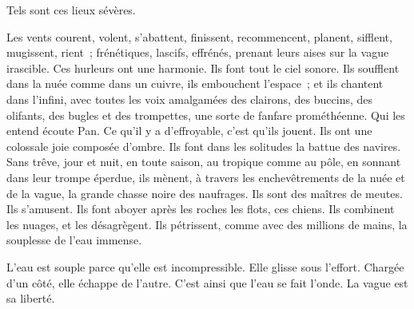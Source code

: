 \documentclass[french,twoside]{book} %
\begin{document}
Tels sont ces lieux sévères.\par
Les vents courent, volent, s’abattent, finissent, recommencent, planent, sifflent, mugissent, rient ; frénétiques, lascifs, effrénés, prenant leurs aises sur la vague irascible. Ces hurleurs ont une harmonie. Ils font tout le ciel sonore. Ils soufflent dans la nuée comme dans un cuivre, ils embouchent l’espace ; et ils chantent dans l’infini, avec toutes les voix amalgamées des clairons, des buccins, des olifants, des bugles et des trompettes, une sorte de fanfare prométhéenne. Qui les entend écoute Pan. Ce qu’il y a d’effroyable, c’est qu’ils jouent. Ils ont une colossale joie composée  d’ombre. Ils font dans les solitudes la battue des navires. Sans trêve, jour et nuit, en toute saison, au tropique comme au pôle, en sonnant dans leur trompe éperdue, ils mènent, à travers les enchevêtrements de la nuée et de la vague, la grande chasse noire des naufrages. Ils sont des maîtres de meutes. Ils s’amusent. Ils font aboyer après les roches les flots, ces chiens. Ils combinent les nuages, et les désagrègent. Ils pétrissent, comme avec des millions de mains, la souplesse de l’eau immense.\par
L’eau est souple parce qu’elle est incompressible. Elle glisse sous l’effort. Chargée d’un côté, elle échappe de l’autre. C’est ainsi que l’eau se fait l’onde. La vague est sa liberté.
\end{document}
